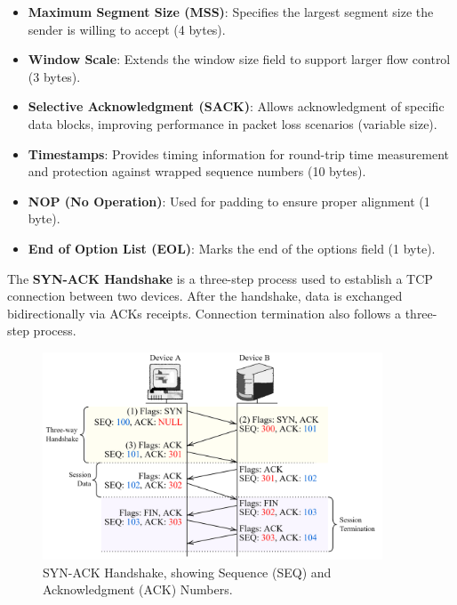 \newpage
\begin{Def}

    \begin{itemize}
        \item \textbf{Maximum Segment Size (MSS)}: Specifies the largest segment size the sender is willing to accept (4 bytes).
        \item \textbf{Window Scale}: Extends the window size field to support larger flow control (3 bytes).
        \item \textbf{Selective Acknowledgment (SACK)}: Allows acknowledgment of specific data blocks, improving performance in packet loss scenarios (variable size).
        \item \textbf{Timestamps}: Provides timing information for round-trip time measurement and protection against wrapped sequence numbers (10 bytes).
        \item \textbf{NOP (No Operation)}: Used for padding to ensure proper alignment (1 byte).
        \item \textbf{End of Option List (EOL)}: Marks the end of the options field (1 byte). \hfill \cite{rfc793}
    \end{itemize}

\end{Def}

\begin{Def}

    The \textbf{SYN-ACK Handshake} is a three-step process used to establish a TCP connection between two devices.
    After the handshake, data is exchanged bidirectionally via ACKs receipts. Connection termination also follows a three-step process.
\end{Def}

\vspace{-1em}
\begin{figure}[h!]
    \hspace{2em}
    \includegraphics[width=0.9\textwidth]{Sections/network/synack.png}
    \caption{SYN-ACK Handshake, showing Sequence (SEQ) and Acknowledgment (ACK) Numbers.}
    \label{fig:tcp_options}
\end{figure}

